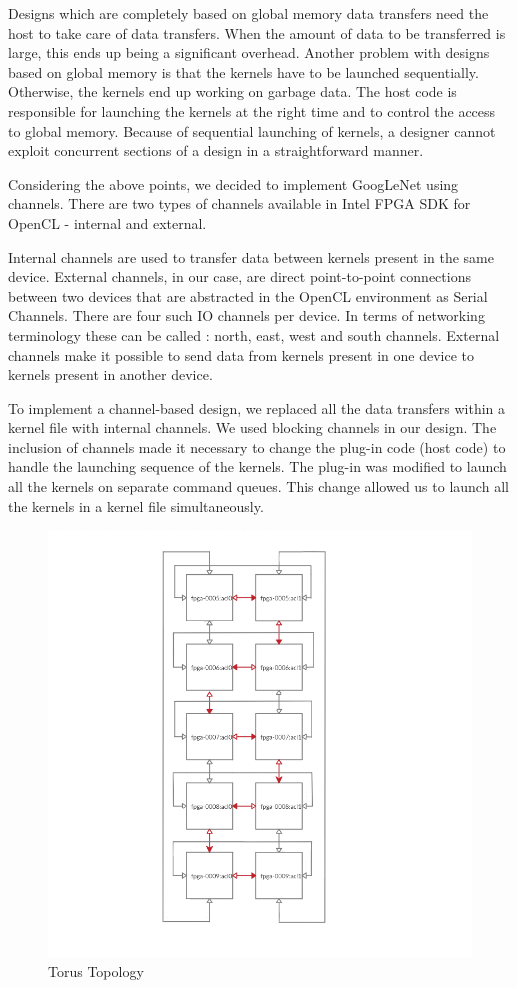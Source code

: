 Designs which are completely based on global memory data transfers need the host to take care of data transfers. When the amount of data to be transferred is large, this ends up being a significant overhead. Another problem with designs based on global memory is that the kernels have to be launched sequentially. Otherwise, the kernels end up working on garbage data. The host code is responsible for launching the kernels at the right time and to control the access to global memory. Because of sequential launching of kernels, a designer cannot exploit concurrent sections of a design in a straightforward manner. 

Considering the above points, we decided to implement GoogLeNet using channels. There are two types of channels available in Intel FPGA SDK for OpenCL - internal and external.

Internal channels are used to transfer data between kernels present in the same device. External channels, in our case, are direct point-to-point connections between two devices that are abstracted in the OpenCL environment as Serial Channels. There are four such IO channels per device. In terms of networking terminology these can be called : north, east, west and south channels. External channels make it possible to send data from kernels present in one device to kernels present in another device. 

To implement a channel-based design, we replaced all the data transfers within a kernel file with internal channels. We used blocking channels in our design. The inclusion of channels made it necessary to change the plug-in code (host code) to handle the launching sequence of the kernels. The plug-in was modified to launch all the kernels on separate command queues. This change allowed us to launch all the kernels in a kernel file simultaneously. 


\begin{figure}[!htb]
  \includegraphics{img/Torus_Topology.PNG}
  \caption{Torus Topology}
  \label{fig:Torus_Topology}
\end{figure}

